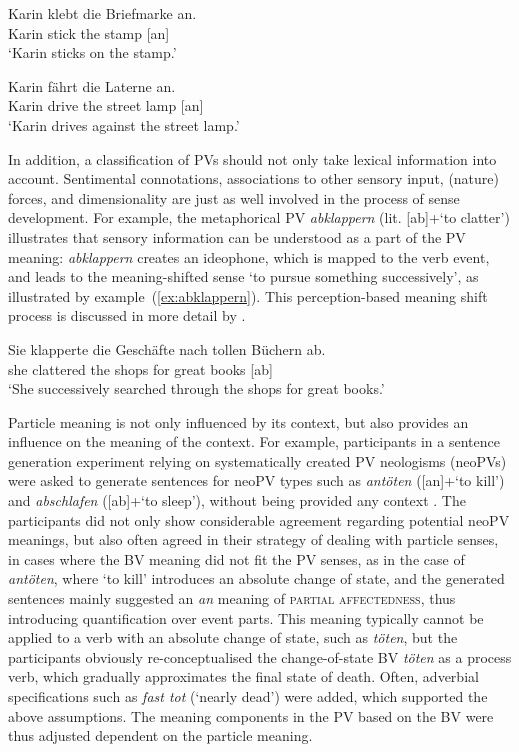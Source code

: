 \documentclass[output=paper]{langsci/langscibook}
\begin{document}
\ea\label{ex:ankleben}
\gll Karin klebt die Briefmarke an.\\
Karin stick the stamp [an]\\
\glt `Karin sticks on the stamp.'
\z

\ea\label{ex:anfahrenLaterne1}
\gll Karin fährt die Laterne an.\\
Karin drive the {street lamp} [an]\\
\glt `Karin drives against the street lamp.'
\z

In addition, a classification of PVs should not only take lexical
information into account. Sentimental connotations, associations to
other sensory input, (nature) forces, and dimensionality are just as
well involved in the process of sense development. For example, the
metaphorical PV \textit{abklappern} (lit. [ab]+`to clatter')
illustrates that sensory information can be understood as a part of
the PV meaning: \textit{abklappern} creates an ideophone, which is
mapped to the verb event, and leads to the meaning-shifted sense `to
pursue something successively', as illustrated by
example~(\ref{ex:abklappern}). This perception-based meaning shift
process is discussed in more detail by \cite{SpringorumEtAl:13}.

\ea\label{ex:abklappern}
\gll Sie klapperte die Geschäfte nach tollen Büchern ab.\\
she clattered the shops for great books [ab]\\
\glt `She successively searched through the shops for great books.'
\z

Particle meaning is not only influenced by its context, but also
provides an influence on the meaning of the context. For example,
participants in a sentence generation experiment relying on
systematically created PV neologisms (neoPVs) were asked to generate
sentences for neoPV types such as \textit{antöten} ([an]+`to kill')
and \textit{abschlafen} ([ab]+`to sleep'), without being provided any
context \citep{SpringorumEtAl:13cALTER}. The participants did not only
show considerable agreement regarding potential neoPV meanings, but
also often agreed in their strategy of dealing with particle senses,
in cases where the BV meaning did not fit the PV senses, as in the
case of \textit{antöten}, where `to kill' introduces an absolute
change of state, and the generated sentences mainly suggested an
\textit{an} meaning of \textsc{partial affectedness}, thus introducing
quantification over event parts. This meaning typically cannot be
applied to a verb with an absolute change of state, such as
\textit{töten}, but the participants obviously re-conceptualised the
change-of-state BV \textit{töten} as a process verb, which gradually
approximates the final state of death. Often, adverbial specifications
such as \textit{fast tot} (`nearly dead') were added, which supported
the above assumptions. The meaning components in the PV based on the
BV were thus adjusted dependent on the particle meaning.
\end{document}
